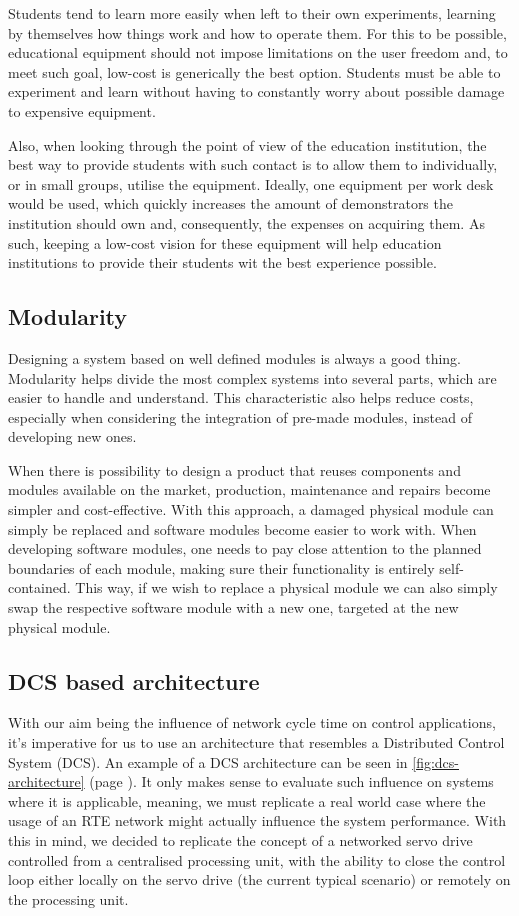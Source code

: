 Students tend to learn more easily when left to their own experiments, learning by themselves how things work and how to operate them. %
For this to be possible, educational equipment should not impose limitations on the user freedom and, to meet such goal, low-cost is generically the best option.
Students must be able to experiment and learn without having to constantly worry about possible damage to expensive equipment.

Also, when looking through the point of view of the education institution, the best way to provide students with such contact is to allow them to individually, or in small groups, utilise the equipment.
Ideally, one equipment per work desk would be used, which quickly increases the amount of demonstrators the institution should own and, consequently, the expenses on acquiring them.
As such, keeping a low-cost vision for these equipment will help education institutions to provide their students wit the best experience possible.

\subsection{Modularity}

Designing a system based on well defined modules is always a good thing.
Modularity helps divide the most complex systems into several parts, which are easier to handle and understand.
This characteristic also helps reduce costs, especially when considering the integration of pre-made modules, instead of developing new ones.

When there is possibility to design a product that reuses components and modules available on the market, production, maintenance and repairs become simpler and cost-effective.
With this approach, a damaged physical module can simply be replaced and software modules become easier to work with.
When developing software modules, one needs to pay close attention to the planned boundaries of each module, making sure their functionality is entirely self-contained.
This way, if we wish to replace a physical module we can also simply swap the respective software module with a new one, targeted at the new physical module.

\subsection{DCS based architecture}

With our aim being the influence of network cycle time on control applications, it's imperative for us to use an architecture that resembles a Distributed Control System (DCS).
An example of a DCS architecture can be seen in \autoref{fig:dcs-architecture} (page \pageref{fig:dcs-architecture}).
It only makes sense to evaluate such influence on systems where it is applicable, meaning, we must replicate a real world case where the usage of an RTE network might actually influence the system performance.
With this in mind, we decided to replicate the concept of a networked servo drive controlled from a centralised processing unit, with the ability to close the control loop either locally on the servo drive (the current typical scenario) or remotely on the processing unit.

